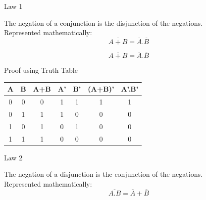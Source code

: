 \documentclass{beamer}
\begin{document}
\begin{frame}{Law 1}
\begin{theorem} 
The negation of a conjunction is the disjunction of the negations.\\
Represented mathematically:
\begin{equation}\label{1}
\overline{A+B}=\overline{A}.\overline{B}
\end{equation}
\end{theorem}
\end{frame}
\begin{frame}
\begin{equation}
                \overline{A+B} = \overline{A}.\overline{B}
\end{equation}
        \begin{block}{Proof using Truth Table}
                \begin{tabular}{|c|c||c||c||c||c||c|}
                        \hline
                         \textbf{A} &
                        \textbf{B} & \textbf{A+B} &\textbf{A'} &
                        \textbf{B'} &\textbf{(A+B)'} & \textbf{A'.B'}\\
                        \hline
                        \hline
                         0 & 0 & 0 & 1 & 1 & 1 & 1\\
                        \hline
                         0 & 1 & 1 & 1 & 0 & 0 & 0 \\
                        \hline
                         1 & 0 & 1 & 0 & 1 & 0 & 0 \\
                        \hline
                         1 & 1 & 1 & 0 & 0 & 0 & 0 \\
                        \hline
                \end{tabular}
        \end{block}
\end{frame}
\begin{frame}{Law 2}
\begin{theorem}
The negation of a disjunction is the conjunction of the negations.\\
Represented mathematically:
\begin{equation}
\overline{A.B}=\overline{A}+\overline{B}
\end{equation}
\end{theorem}
\end{frame}
\end{document}
